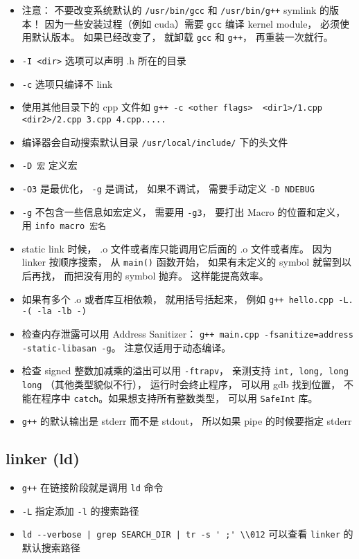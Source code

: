 
\begin{issues}
\issueDraft
\end{issues}


\begin{itemize}
\item 注意： 不要改变系统默认的 \verb|/usr/bin/gcc| 和 \verb|/usr/bin/g++| symlink 的版本！ 因为一些安装过程（例如 cuda）需要 \verb|gcc| 编译 kernel module， 必须使用默认版本。 如果已经改变了， 就卸载 \verb|gcc| 和 \verb|g++|， 再重装一次就行。
\item \verb|-I <dir>| 选项可以声明 .h 所在的目录
\item \verb|-c| 选项只编译不 link
\item 使用其他目录下的 cpp 文件如 \verb|g++ -c <other flags>  <dir1>/1.cpp <dir2>/2.cpp 3.cpp 4.cpp.....|
\item 编译器会自动搜索默认目录 \verb|/usr/local/include/| 下的头文件
\item \verb|-D 宏| 定义宏
\item \verb|-O3| 是最优化， \verb|-g| 是调试， 如果不调试， 需要手动定义 \verb|-D NDEBUG|
\item \verb|-g| 不包含一些信息如宏定义， 需要用 \verb|-g3|， 要打出 Macro 的位置和定义， 用 \verb|info macro 宏名|
\item static link 时候， .o 文件或者库只能调用它后面的 .o 文件或者库。 因为 linker 按顺序搜索， 从 \verb|main()| 函数开始， 如果有未定义的 symbol 就留到以后再找， 而把没有用的 symbol 抛弃。 这样能提高效率。
\item 如果有多个 .o 或者库互相依赖， 就用括号括起来， 例如 \verb|g++ hello.cpp -L. -( -la -lb -)|
\item 检查内存泄露可以用 Address Sanitizer： \verb|g++ main.cpp -fsanitize=address -static-libasan -g|。 注意仅适用于动态编译。
\item 检查 signed 整数加减乘的溢出可以用 \verb|-ftrapv|， 亲测支持 \verb|int, long, long long| （其他类型貌似不行）， 运行时会终止程序， 可以用 gdb 找到位置， 不能在程序中 \verb|catch|。如果想支持所有整数类型， 可以用 \verb|SafeInt| 库。
\item \verb|g++| 的默认输出是 stderr 而不是 stdout， 所以如果 pipe 的时候要指定 stderr
\end{itemize}

\subsection{linker (ld)}
\begin{itemize}
\item \verb|g++| 在链接阶段就是调用 \verb|ld| 命令
\item \verb|-L| 指定添加 \verb|-l| 的搜索路径
\item \verb`ld --verbose | grep SEARCH_DIR | tr -s ' ;' \\012` 可以查看 \verb|linker| 的默认搜索路径
\end{itemize}

